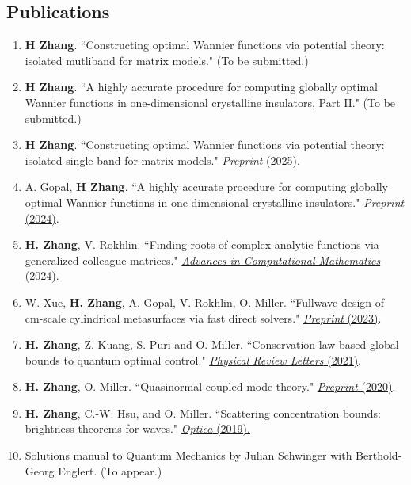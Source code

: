 \documentclass[margin,line,pifont,palatino,courier]{res}
\begin{document}
\begin{resume}
\section{\sc Publications}
\begin{enumerate}
\setlength\itemsep{0em}
	\item{\textbf{H Zhang}. ``Constructing optimal Wannier functions via potential theory: isolated mutliband for matrix models." (To be submitted.) }
	\item{ \textbf{H Zhang}. ``A highly accurate procedure for computing globally optimal Wannier functions in one-dimensional crystalline insulators, Part II." (To be submitted.) }
	\item{\textbf{H Zhang}. ``Constructing optimal Wannier functions via potential theory: isolated single band for matrix models." \href{https://arxiv.org/abs/2502.08641}{\color{blue} \emph{Preprint} (2025)}.}
	\item{A. Gopal, \textbf{H Zhang}. ``A highly accurate procedure for computing globally optimal Wannier functions in one-dimensional crystalline insulators." \href{https://arxiv.org/abs/2409.04369}{\color{blue} \emph{Preprint} (2024)}.}
	\item \textbf{H. Zhang}, V. Rokhlin. ``Finding roots of complex analytic functions via generalized colleague matrices." \href{https://link.springer.com/article/10.1007/s10444-024-10174-z}{\color{blue}  \emph{Advances in Computational Mathematics} (2024).}
	\item W. Xue, \textbf{H. Zhang}, A. Gopal, V. Rokhlin, O. Miller. ``Fullwave design of cm-scale cylindrical metasurfaces via fast direct solvers." \href{https://arxiv.org/abs/2308.08569}{\color{blue} \emph{Preprint} (2023)}.
	\item{\textbf{H. Zhang}, Z. Kuang, S. Puri and O. Miller. ``Conservation-law-based global bounds to quantum optimal control." \href{https://journals.aps.org/prl/abstract/10.1103/PhysRevLett.127.110506}{\color{blue} \emph{Physical Review Letters} (2021)}.}
	\item{\textbf{H. Zhang}, O. Miller. ``Quasinormal coupled mode theory." \href{https://arxiv.org/abs/2010.08650}{\color{blue} \emph{Preprint} (2020)}.}
	\item{\textbf{H. Zhang}, C.-W. Hsu, and O. Miller. ``Scattering concentration bounds: brightness theorems for waves." \href{https://doi.org/10.1364/OPTICA.6.001321}{\color{blue} \emph{Optica} (2019).}}
	\item{Solutions manual to Quantum Mechanics by Julian Schwinger with Berthold-Georg Englert. (To appear.)}
\end{enumerate}


\end{resume}
\end{document}
